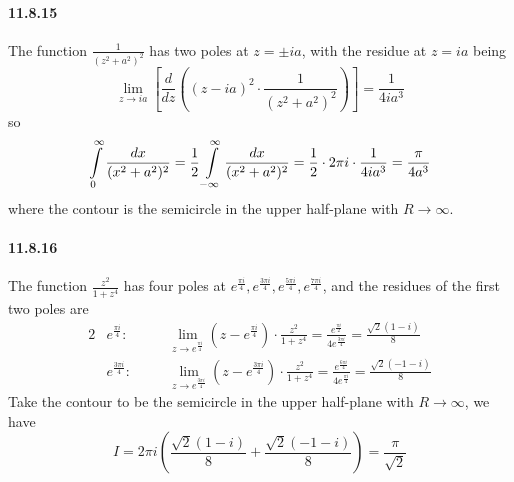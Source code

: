 \documentclass[a4paper]{article}
\begin{document}
\paragraph{11.8.15}
The function $\frac{1}{(z^2+a^2)^2}$ has two poles at $z=\pm ia$, with the residue at $z=ia$ being
\[
\lim_{z\to ia}\left[\frac{d}{dz}\left((z-ia)^2\cdot\frac{1}{(z^2+a^2)^2} \right) \right]=\frac{1}{4ia^3}
\]
so
\[
\int\displaylimits_{0}^\infty\frac{dx}{(x^2+a^2)^2}=\frac{1}{2}\int\displaylimits_{-\infty}^\infty\frac{dx}{(x^2+a^2)^2}=\frac{1}{2}\cdot2\pi i\cdot\frac{1}{4ia^3}=\frac{\pi}{4a^3}
\]
where the contour is the semicircle in the upper half-plane with $R\to\infty$.

\paragraph{11.8.16}
The function $\frac{z^2}{1+z^4}$ has four poles at $e^{\frac{\pi i}{4}}, e^{\frac{3\pi i}{4}}, e^{\frac{5\pi i}{4}}, e^{\frac{7\pi i}{4}}$, and the residues of the first two poles are
\begin{alignat*}{2}
& e^{\frac{\pi i}{4}}:\quad && \lim_{z\to e^{\frac{\pi i}{4}}}(z-e^{\frac{\pi i}{4}})\cdot\frac{z^2}{1+z^4}=\frac{e^{\frac{\pi i}{2}}}{4e^{\frac{3\pi i}{4}}}=\frac{\sqrt{2}(1-i)}{8}\\
& e^{\frac{3\pi i}{4}}:\quad && \lim_{z\to e^{\frac{3\pi i}{4}}}(z-e^{\frac{3\pi i}{4}})\cdot\frac{z^2}{1+z^4}=\frac{e^{\frac{6\pi i}{4}}}{4e^{\frac{\pi i}{4}}}=\frac{\sqrt{2}(-1-i)}{8}
\end{alignat*}
Take the contour to be the semicircle in the upper half-plane with $R\to\infty$, we have
\[
I=2\pi i\left(\frac{\sqrt{2}(1-i)}{8}+\frac{\sqrt{2}(-1-i)}{8} \right)=\frac{\pi}{\sqrt{2}}
\]
\end{document}
